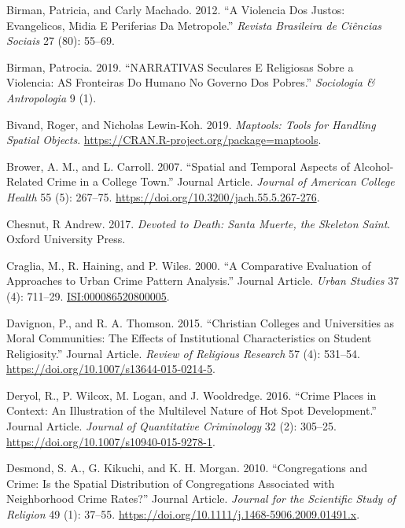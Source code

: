 \documentclass[smallextended]{svjour3}       %
\begin{document}
\leavevmode\hypertarget{ref-Birman2012violencia}{}%
Birman, Patricia, and Carly Machado. 2012. ``A Violencia Dos Justos:
Evangelicos, Midia E Periferias Da Metropole.'' \emph{Revista Brasileira
de Ciências Sociais} 27 (80): 55--69.

\leavevmode\hypertarget{ref-Birman2019narrativas}{}%
Birman, Patrocia. 2019. ``NARRATIVAS Seculares E Religiosas Sobre a
Violencia: AS Fronteiras Do Humano No Governo Dos Pobres.''
\emph{Sociologia \& Antropologia} 9 (1).

\leavevmode\hypertarget{ref-Bivand2019maptools}{}%
Bivand, Roger, and Nicholas Lewin-Koh. 2019. \emph{Maptools: Tools for
Handling Spatial Objects}.
\url{https://CRAN.R-project.org/package=maptools}.

\leavevmode\hypertarget{ref-Brower2007spatial}{}%
Brower, A. M., and L. Carroll. 2007. ``Spatial and Temporal Aspects of
Alcohol-Related Crime in a College Town.'' Journal Article.
\emph{Journal of American College Health} 55 (5): 267--75.
\url{https://doi.org/10.3200/jach.55.5.267-276}.

\leavevmode\hypertarget{ref-Chesnut2017devoted}{}%
Chesnut, R Andrew. 2017. \emph{Devoted to Death: Santa Muerte, the
Skeleton Saint}. Oxford University Press.

\leavevmode\hypertarget{ref-Craglia2000comparative}{}%
Craglia, M., R. Haining, and P. Wiles. 2000. ``A Comparative Evaluation
of Approaches to Urban Crime Pattern Analysis.'' Journal Article.
\emph{Urban Studies} 37 (4): 711--29. \url{ISI:000086520800005}.

\leavevmode\hypertarget{ref-Davignon2015christian}{}%
Davignon, P., and R. A. Thomson. 2015. ``Christian Colleges and
Universities as Moral Communities: The Effects of Institutional
Characteristics on Student Religiosity.'' Journal Article. \emph{Review
of Religious Research} 57 (4): 531--54.
\url{https://doi.org/10.1007/s13644-015-0214-5}.

\leavevmode\hypertarget{ref-Deryol2016crime}{}%
Deryol, R., P. Wilcox, M. Logan, and J. Wooldredge. 2016. ``Crime Places
in Context: An Illustration of the Multilevel Nature of Hot Spot
Development.'' Journal Article. \emph{Journal of Quantitative
Criminology} 32 (2): 305--25.
\url{https://doi.org/10.1007/s10940-015-9278-1}.

\leavevmode\hypertarget{ref-Desmond2010congregations}{}%
Desmond, S. A., G. Kikuchi, and K. H. Morgan. 2010. ``Congregations and
Crime: Is the Spatial Distribution of Congregations Associated with
Neighborhood Crime Rates?'' Journal Article. \emph{Journal for the
Scientific Study of Religion} 49 (1): 37--55.
\url{https://doi.org/10.1111/j.1468-5906.2009.01491.x}.
\end{document}
